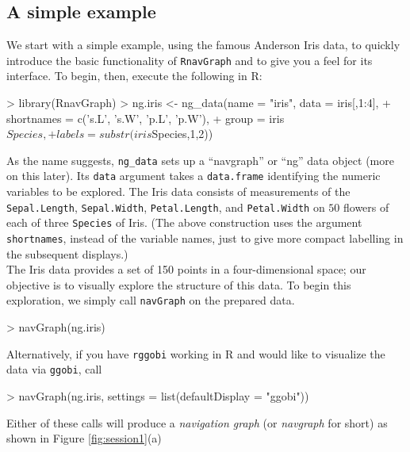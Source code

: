 \documentclass[12pt,oneside,titlepage,letter]{article}
\begin{document}
\subsection{A simple example}
We start with a simple example, using the famous Anderson Iris data, to quickly introduce the
basic functionality of \texttt{RnavGraph} and to give you a feel for its interface.
To begin, then, execute the following in R:
\begin{Schunk}
\begin{Sinput}
> library(RnavGraph)
> ng.iris <- ng_data(name = "iris", data = iris[,1:4],
+                    shortnames = c('s.L', 's.W', 'p.L', 'p.W'),
+                    group = iris$Species,
+                    labels = substr(iris$Species,1,2))
\end{Sinput}
\end{Schunk}
As the name suggests, \texttt{ng\_data} sets up a ``navgraph'' or ``ng'' data object (more on this later). 
Its  \texttt{data} argument takes a \texttt{data.frame} identifying the numeric variables to be explored.  The Iris data consists of measurements of the \texttt{Sepal.Length}, \texttt{Sepal.Width}, \texttt{Petal.Length}, and  \texttt{Petal.Width} on $50$ flowers of each of three \texttt{Species} of Iris. (The above construction uses the argument \texttt{shortnames}, instead of the variable names, just to give more compact labelling in the subsequent displays.) \\

The Iris data provides a set of 150 points in a four-dimensional space; our objective is to visually explore the structure of this data.  To begin this exploration, we simply call \texttt{navGraph} on the prepared data.
\begin{Schunk}
\begin{Sinput}
> navGraph(ng.iris)
\end{Sinput}
\end{Schunk}
Alternatively, if you have \texttt{rggobi} working in R and would like to visualize the data via \texttt{ggobi}, call
\begin{Schunk}
\begin{Sinput}
> navGraph(ng.iris, settings = list(defaultDisplay = "ggobi"))
\end{Sinput}
\end{Schunk}
Either of these calls will produce a {\em navigation graph} (or {\em navgraph} for short) as shown in
Figure \ref{fig:session1}(a)
\end{document}
